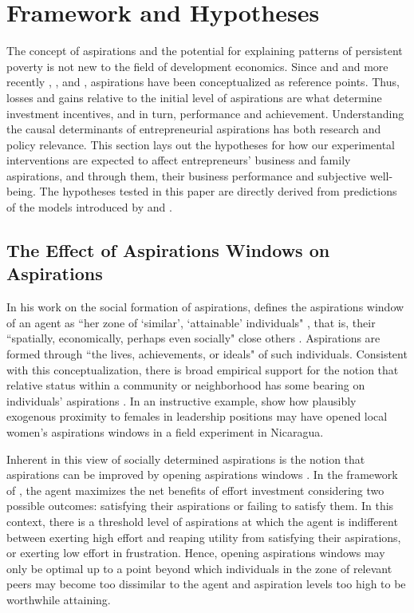 \documentclass[11.5pt]{article}
\begin{document}
\section{Framework and Hypotheses} \label{sec:theory}

The concept of aspirations and the potential for explaining patterns of persistent poverty is not new to the field of development economics. Since \citet{Simon1955} and \citet{Selten1998} and more recently \citet{Bogliacino2014}, \citet{Dalton2016}, and \citet{Genicot2017}, aspirations have been conceptualized as reference points. Thus, losses and gains relative to the initial level of aspirations are what determine investment incentives, and in turn, performance and achievement. Understanding the causal determinants of entrepreneurial aspirations has both research and policy relevance. This section lays out the hypotheses for how our experimental interventions are expected to affect entrepreneurs' business and family aspirations, and through them, their business performance and subjective well-being. The hypotheses tested in this paper are directly derived from predictions of the models introduced by \citet{Dalton2016} and \citet{Genicot2017}.

\subsection{The Effect of Aspirations Windows on Aspirations}

In his work on the social formation of aspirations, \citet{Ray2003, Ray2006} defines the aspirations window of an agent as ``her zone of  `similar', `attainable' individuals" \citep[][p.1]{Ray2003}, that is, their ``spatially, economically, perhaps even socially" close others \citep[][p.2]{Ray2003}. Aspirations are formed through ``the lives, achievements, or ideals" \citep[][p.2]{Ray2003} of such individuals. Consistent with this conceptualization, there is broad empirical support for the notion that relative status within a community or neighborhood has some bearing on individuals' aspirations \citep[][]{Bernard2014, Beaman2012, Janzen2017, Knight2012, Stutzer2004}. In an instructive example, \citet{Macours2014} show how plausibly exogenous proximity to females in leadership positions may have opened local women's aspirations windows in a field experiment in Nicaragua.

Inherent in this view of socially determined aspirations is the notion that aspirations can be improved by opening aspirations windows \citep[see,][]{Ray2006, Genicot2017, Janzen2017}. In the framework of \citet{Genicot2017}, the agent maximizes the net benefits of effort investment considering two possible outcomes: satisfying their aspirations or failing to satisfy them. In this context, there is a threshold level of aspirations at which the agent is indifferent between exerting high effort and reaping utility from satisfying their aspirations, or exerting low effort in frustration. Hence, opening aspirations windows may only be optimal up to a point beyond which individuals in the zone of relevant peers may become too dissimilar to the agent and aspiration levels too high to be worthwhile attaining.
\end{document}
